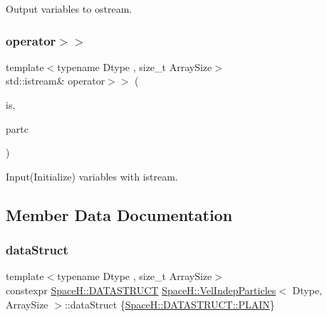 Output variables to ostream. 

\mbox{\label{class_space_h_1_1_vel_indep_particles_a26d445a8934430c0634f60e387853724}} 
\subsubsection{\texorpdfstring{operator$>$$>$}{operator>>}}
{\footnotesize\ttfamily template$<$typename Dtype , size\+\_\+t Array\+Size$>$ \\
std\+::istream\& operator$>$$>$ (\begin{DoxyParamCaption}\item[{std\+::istream \&}]{is,  }\item[{\mbox{\hyperlink{class_space_h_1_1_vel_indep_particles}{Vel\+Indep\+Particles}}$<$ Dtype, Array\+Size $>$ \&}]{partc }\end{DoxyParamCaption})\hspace{0.3cm}{\ttfamily [friend]}}



Input(\+Initialize) variables with istream. 



\subsection{Member Data Documentation}
\mbox{\label{class_space_h_1_1_vel_indep_particles_a066cbb08e0d444c27e2f71c30092e13f}} 
\subsubsection{\texorpdfstring{data\+Struct}{dataStruct}}
{\footnotesize\ttfamily template$<$typename Dtype , size\+\_\+t Array\+Size$>$ \\
constexpr \mbox{\hyperlink{namespace_space_h_a4782f089179a3c269891f02482b072df}{Space\+H\+::\+D\+A\+T\+A\+S\+T\+R\+U\+CT}} \mbox{\hyperlink{class_space_h_1_1_vel_indep_particles}{Space\+H\+::\+Vel\+Indep\+Particles}}$<$ Dtype, Array\+Size $>$\+::data\+Struct \{\mbox{\hyperlink{namespace_space_h_a4782f089179a3c269891f02482b072dfaf62eb0bf5e5c72e80983fbbac1cb70e5}{Space\+H\+::\+D\+A\+T\+A\+S\+T\+R\+U\+C\+T\+::\+P\+L\+A\+IN}}\}\hspace{0.3cm}{\ttfamily [static]}}

